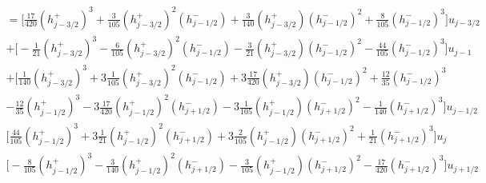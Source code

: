 \documentclass[12pt]{article}
\begin{document}
\begin{multline*}
=\bigg[\frac{17}{420}\left(h^+_{j - 3/2}\right)^3 +  \frac{3}{105} \left(h^+_{j - 3/2}\right)^2 \left(h^-_{j - 1/2}\right)
+ \frac{3}{140} \left(h^+_{j - 3/2}\right) \left(h^-_{j - 1/2}\right)^2 +  \frac{8}{105}\left(h^-_{j - 1/2}\right)^3  \bigg] u_{j - 3/2} \\
+ \bigg[-\frac{1}{21}\left(h^+_{j - 3/2}\right)^3 - \frac{6}{105} \left(h^+_{j - 3/2}\right)^2 \left(h^-_{j - 1/2}\right)
-  \frac{3}{21} \left(h^+_{j - 3/2}\right) \left(h^-_{j - 1/2}\right)^2 - \frac{44}{105}  \left(h^-_{j - 1/2}\right)^3 \bigg] u_{j - 1} \\
+ \bigg[\frac{1}{140}\left(h^+_{j - 3/2}\right)^3 + 3 \frac{1}{105} \left(h^+_{j - 3/2}\right)^2 \left(h^-_{j - 1/2}\right)
+ 3 \frac{17}{420} \left(h^+_{j - 3/2}\right) \left(h^-_{j - 1/2}\right)^2 +  \frac{12}{35} \left(h^-_{j - 1/2}\right)^3 \\ - \frac{12}{35} \left(h^+_{j - 1/2} \right)^3 - 3\frac{17}{420}  \left(h^+_{j - 1/2} \right)^2\left(h^-_{j + 1/2}\right) - 3\frac{1}{105} \left(h^+_{j - 1/2} \right)\left(h^-_{j + 1/2}\right)^2 - \frac{1}{140} \left(h^-_{j + 1/2}\right)^3 \bigg] u_{j - 1/2} \\
\bigg[\frac{44}{105}\left(h^+_{j - 1/2} \right)^3 + 3 \frac{1}{21}\left(h^+_{j - 1/2} \right)^2\left(h^-_{j + 1/2}\right) + 3 \frac{2}{105} \left(h^+_{j - 1/2} \right)\left(h^-_{j + 1/2}\right)^2 + \frac{1}{21}\left(h^-_{j + 1/2}\right)^3 \bigg] u_{j}\\
\bigg[ - \frac{8}{105}\left(h^+_{j - 1/2} \right)^3 - \frac{3}{140}  \left(h^+_{j - 1/2} \right)^2\left(h^-_{j + 1/2}\right) - \frac{3}{105} \left(h^+_{j - 1/2} \right)\left(h^-_{j + 1/2}\right)^2  - \frac{17}{420} \left(h^-_{j + 1/2}\right)^3 \bigg] u_{j + 1/2}
\end{multline*}
\end{document}
